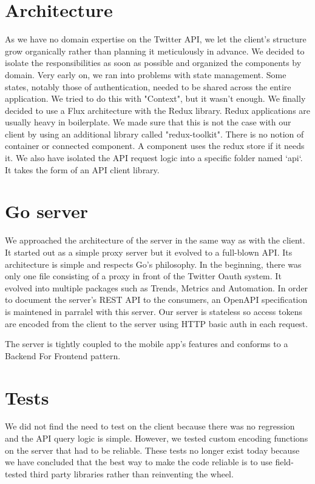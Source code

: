 \documentclass{report}
\begin{document}
\section{Architecture}
As we have no domain expertise on the Twitter API, we let the client's structure grow organically rather than planning it meticulously in advance. We decided to isolate the responsibilities as soon as possible and organized the components by domain. Very early on, we ran into problems with state management. Some states, notably those of authentication, needed to be shared across the entire application. We tried to do this with "Context", but it wasn't enough. We finally decided to use a Flux architecture with the Redux library. 
Redux applications are usually heavy in boilerplate. We made sure that this is not the case with our client by using an additional library called "redux-toolkit". There is no notion of container or connected component. A component uses the redux store if it needs it. 
We also have isolated the API request logic into a specific folder named `api`. It takes the form of an API client library.

\section{Go server}

We approached the architecture of the server in the same way as with the client. It started out as a simple proxy server but it evolved to a full-blown API. Its architecture is simple and respects Go's philosophy. In the beginning, there was only one file consisting of a proxy in front of the Twitter Oauth system. It evolved into multiple packages such as Trends, Metrics and Automation.
In order to document the server's REST API to the consumers, an OpenAPI specification is maintened in parralel with this server. Our server is stateless so access tokens are encoded from the client to the server using HTTP basic auth in each request.

The server is tightly coupled to the mobile app's features and conforms to a Backend For Frontend pattern.

\section{Tests}
We did not find the need to test on the client because there was no regression and the API query logic is simple. However, we tested custom encoding functions on the server that had to be reliable. These tests no longer exist today because we have concluded that the best way to make the code reliable is to use field-tested third party libraries rather than reinventing the wheel.
\end{document}
